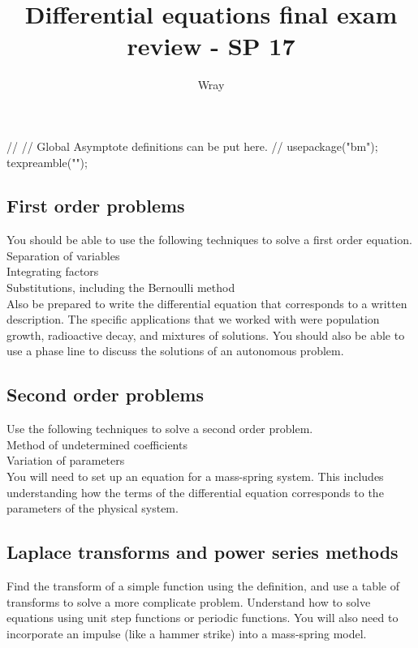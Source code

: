 \documentclass[12pt]{exam}
\title{Differential equations final exam review - SP 17}
\author{Wray}
\begin{document}
\begin{asydef}
//
// Global Asymptote definitions can be put here.
//
usepackage("bm");
texpreamble("\def\V#1{\bm{#1}}");
\end{asydef}

\newline
\newline

\subsection*{First order problems}

You should be able to use the following techniques to solve a first order equation. \\

Separation of variables \\
Integrating factors \\
Substitutions, including the Bernoulli method \\

Also be prepared to write the differential equation that corresponds to a written description.  The specific applications that we worked with were population growth, radioactive decay, and mixtures of solutions.  You should also be able to use a phase line to discuss the solutions of an autonomous problem.

\subsection*{Second order problems}

Use the following techniques to solve a second order problem.\\

Method of undetermined coefficients \\
Variation of parameters \\

You will need to set up an equation for a mass-spring system.  This includes understanding how the terms of the differential equation corresponds to the parameters of the physical system.  

\subsection*{Laplace transforms and power series methods}

Find the transform of a simple function using the definition, and use a table of transforms to solve a more complicate problem.  Understand how to solve equations using unit step functions or periodic functions.  You will also need to incorporate an impulse (like a hammer strike) into a mass-spring model. \\
\end{document}
